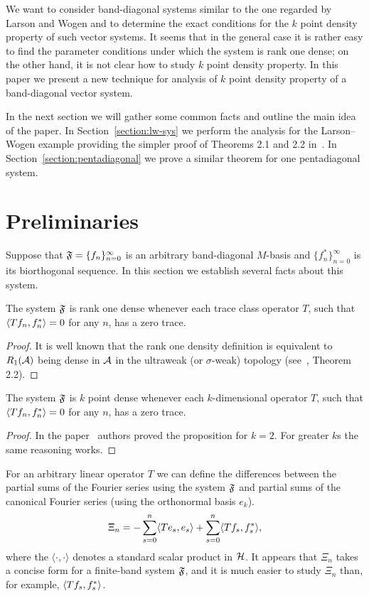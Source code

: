 \documentclass[12pt]{amsart}
\theoremstyle{case}
\begin{document}
    We want to consider band-diagonal systems similar to the one regarded by Larson and Wogen and to determine the exact conditions
      for the $k$ point density property of such vector systems.
    It seems that in the general case it is rather easy to find the parameter conditions under which the system is rank one dense;
      on the other hand, it is not clear how to study $k$ point density property.
    In this paper we present a new technique for analysis of $k$ point density property of a band-diagonal vector system.

    In the next section we will gather some common facts and outline the main idea of the paper.
    In Section~\ref{section:lw-sys} we perform the analysis for the Larson--Wogen example providing the simpler proof of Theorems 2.1 and 2.2 in~\cite{katavolos}.
    In Section~\ref{section:pentadiagonal} we prove a similar theorem for one pentadiagonal system.
\section{Preliminaries}
  \label{sec:preliminaries}
  Suppose that $\fsys=\{f_n\}_{n=0}^\infty$ is an arbitrary band-diagonal $M$-basis and $\{f^*_n\}_{n=0}^\infty$ is its biorthogonal sequence.
  In this section we establish several facts about this system.
  \begin{prop}
    The system $\fsys$ is rank one dense whenever each trace class operator $T$,
      such that $\inner{Tf_n}{f_n^*} = 0$ for any $n$, has a zero trace.
  \end{prop}
  \begin{proof}
    It is well known that the rank one density definition is equivalent to $R_1(\cal{A})$ being dense
      in $\cal{A}$ in the ultraweak (or $\sigma$-weak) topology (see~\cite{katavolos}, Theorem 2.2).
  \end{proof}
  \begin{prop}
    The system $\fsys$ is $k$ point dense whenever each $k$-dimensional operator $T$,
      such that $\inner{Tf_n}{f_n^*} = 0$ for any $n$, has a zero trace.
  \end{prop}
  \begin{proof}
    In the paper~\cite{katavolos} authors proved the proposition for $k = 2$.
    For greater $k$s the same reasoning works.
  \end{proof}
  For an arbitrary linear operator $T$ we can define the differences between
    the partial sums of the Fourier series using the system $\fsys$ and
    partial sums of the canonical Fourier series (using the orthonormal basis $e_k$).
  \begin{equation}
    \label{eq:xi}
    \Xi_n = -\sum_{s=0}^n \inner{Te_s}{e_s} + \sum_{s=0}^n \inner{Tf_s}{f_s^*},
  \end{equation}
    where the $\langle \cdot, \cdot\rangle$ denotes a standard scalar product in $\cal{H}$.
  It appears that $\Xi_n$ takes a concise form for a finite-band system $\fsys$, and it is much easier to study $\Xi_n$
    than, for example, $\inner{Tf_s}{f_s^*}$.
\end{document}
